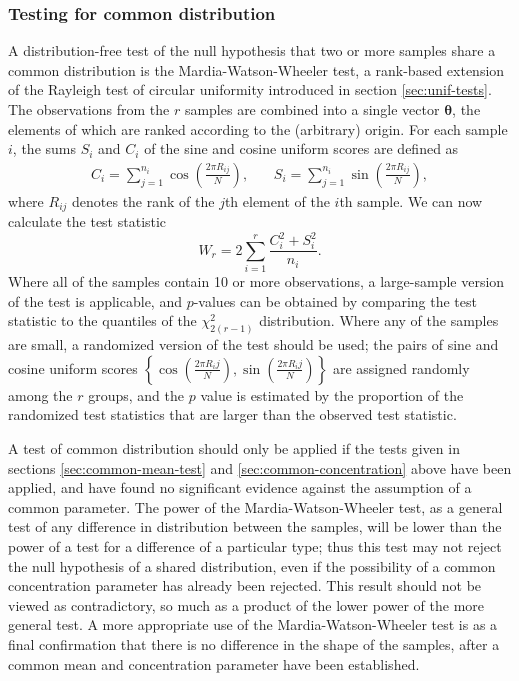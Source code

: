 \documentclass[../../ArchStats.tex]{subfiles}
\begin{document}

\subsubsection{Testing for common distribution}

A distribution-free test of the null hypothesis that two or more samples share a common distribution is the Mardia-Watson-Wheeler test, a rank-based extension of the Rayleigh test of circular uniformity introduced in section \ref{sec:unif-tests}. The observations from the $r$ samples are combined into a single vector $\boldsymbol{\theta}$, the elements of which are ranked according to the (arbitrary) origin. For each sample $i$, the sums $S_i$ and $C_i$ of the sine and cosine uniform scores are defined as
\[
\begin{matrix*}
C_i = \sum_{j=1}^{n_i} \cos \left( \frac{2\pi R_{ij}}{N} \right),  & \,  &
S_i = \sum_{j=1}^{n_i} \sin \left( \frac{2\pi R_{ij}}{N} \right),
\end{matrix*} 
\]
where $R_{ij}$ denotes the rank of the $j$th element of the $i$th sample. We can now calculate the test statistic
\[W_r = 2 \sum_{i=1}^r \frac{C_i^2 + S_i^2}{n_i}. \]
Where all of the samples contain 10 or more observations, a large-sample version of the test is applicable, and $p$-values can be obtained by comparing the test statistic to the quantiles of the $\chi^2_{2(r-1)}$ distribution. Where any of the samples are small, a randomized version of the test should be used; the pairs of sine and cosine uniform scores $\left\lbrace \cos \left( \frac{2\pi R_ij}{N}\right), \sin \left( \frac{2\pi R_ij}{N}\right) \right\rbrace$ are assigned randomly among the $r$ groups, and the $p$ value is estimated by the proportion of the randomized test statistics that are larger than the observed test statistic.

A test of common distribution should only be applied if the tests given in sections \ref{sec:common-mean-test} and \ref{sec:common-concentration} above have been applied, and have found no significant evidence against the assumption of a common parameter. The power of the Mardia-Watson-Wheeler test, as a general test of any difference in distribution between the samples, will be lower than the power of a test for a difference of a particular type; thus this test may not reject the null hypothesis of a shared distribution, even if the possibility of a common concentration parameter has already been rejected. This result should not be viewed as contradictory, so much as a product of the lower power of the more general test. A more appropriate use of the Mardia-Watson-Wheeler test is as a final confirmation that there is no difference in the shape of the samples, after a common mean and concentration parameter have been established.
\end{document}

